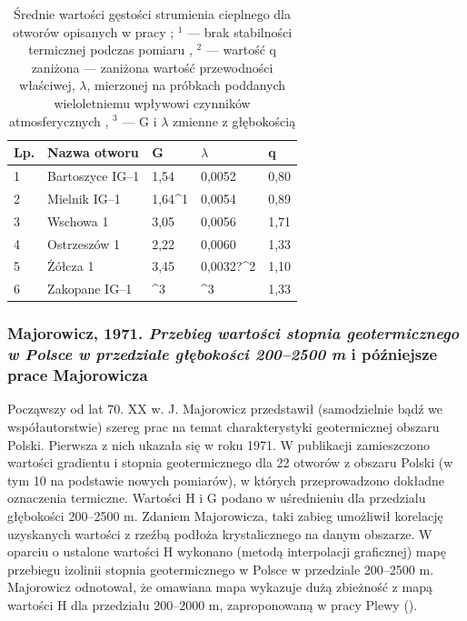 \documentclass[11.5pt,twoside]{report}
\begin{document}
\begin{table}[h]
	\centering
	\caption{Średnie wartości gęstości strumienia cieplnego dla otworów opisanych w pracy \cite{Plewa.1966}; ${}^{1}$ --- brak stabilności termicznej podczas pomiaru \parencite{Plewa.1994}, ${}^{2}$ --- wartość q zaniżona --- zaniżona wartość przewodności właściwej, $\lambda$, mierzonej na próbkach poddanych wieloletniemu wpływowi czynników atmosferycznych \parencite{Plewa.1994}, ${}^{3}$ --- G i $\lambda$ zmienne z głębokością \parencite{Plewa.1966}}
	\label{plewa}
	\begin{tabular}{@{}lllll@{}}
		\toprule
		Lp. & Nazwa otworu     & G    & $\lambda$ & q    \\ \midrule
		1   & Bartoszyce IG--1 & 1,54 & 0,0052                 & 0,80 \\
		2   & Mielnik IG--1    & {1,64}^{1} & 0,0054                 & 0,89 \\
		3   & Wschowa 1        & 3,05 & 0,0056                 & 1,71 \\
		4   & Ostrzeszów 1     & 2,22 & 0,0060                 & 1,33 \\
		5   & Żółcza 1        & 3,45 & {0,0032?}^{2}                & 1,10 \\

		6   & Zakopane IG--1   & {}^{3}    & {}^{3}                      & 1,33 \\ \bottomrule
	\end{tabular}
\end{table}

\subsubsection{Majorowicz, 1971. \textit{Przebieg wartości stopnia geotermicznego w Polsce w przedziale głębokości 200--2500 m} i pó\'{z}niejsze prace Majorowicza}
Począwszy od lat 70. XX w. J. Majorowicz przedstawił (samodzielnie bądź we współautorstwie) szereg prac na temat charakterystyki geotermicznej obszaru Polski. Pierwsza z nich ukazała się w roku 1971. W publikacji zamieszczono wartości gradientu i stopnia geotermicznego dla 22 otworów z obszaru Polski (w tym 10 na podstawie nowych pomiarów), w których przeprowadzono dokładne oznaczenia termiczne. Wartości H i G podano w uśrednieniu dla przedzialu głębokości 200--2500 m. Zdaniem Majorowicza, taki zabieg umożliwił korelację uzyskanych wartości z rzeźbą podłoża krystalicznego na danym obszarze. W oparciu o ustalone wartości H wykonano (metodą interpolacji graficznej) mapę przebiegu izolinii stopnia geotermicznego w Polsce w przedziale 200--2500 m. Majorowicz odnotował, że omawiana mapa wykazuje dużą zbieżność z mapą wartości H dla przedziału 200--2000 m, zaproponowaną w pracy Plewy (\citeyear{Plewa.1966}).
\end{document}
